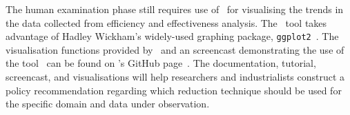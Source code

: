 The human examination phase still requires use of \mr~for visualising the trends in the data collected from efficiency
and effectiveness analysis. The \mr~tool takes advantage of Hadley Wickham's widely-used graphing package,
\texttt{ggplot2}~\cite{ggplot2}. The visualisation functions provided by \mr~and an screencast demonstrating the use of
the tool~\cite{asciinema} can be found on \mr's GitHub page~\cite{tool}. The documentation, tutorial, screencast, and
visualisations will help researchers and industrialists construct a policy recommendation regarding which reduction
technique should be used for the specific domain and data under observation.


